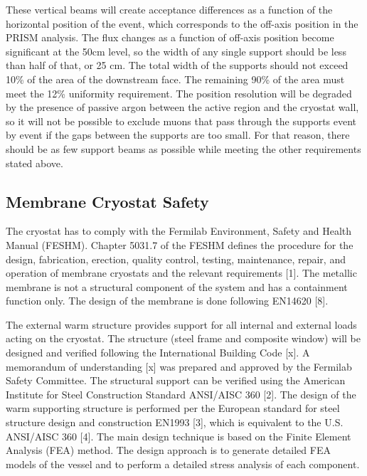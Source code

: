 These vertical beams will create acceptance differences as a function of the horizontal position of the event, which corresponds to the off-axis position in the PRISM analysis. The flux changes as a function of off-axis position become significant at the 50cm level, so the width of any single support should be less than half of that, or 25 cm. The total width of the supports should not exceed 10\% of the area of the downstream face. The remaining 90\% of the area must meet the 12\% uniformity requirement. The position resolution will be degraded by the presence of passive argon between the active region and the cryostat wall, so it will not be possible to exclude muons that pass through the supports event by event if the gaps between the supports are too small. For that reason, there should be as few support beams as possible while meeting the other requirements stated above.



\subsection{Membrane Cryostat Safety}
\label{sec:cryost-des-safety}

The  cryostat has to comply with the Fermilab Environment, Safety and Health Manual (FESHM). Chapter 5031.7 of the FESHM defines the procedure for the design, fabrication, erection, quality control, testing, maintenance, repair, and operation of membrane cryostats and the relevant requirements [1]. The metallic membrane is not a structural component of the system and has a containment function only. The design of the membrane is done following EN14620 [8].

The external warm structure provides support for all internal and external loads acting on the cryostat. The structure (steel frame and composite window) will be designed and verified following the International Building Code [x]. A memorandum of understanding [x] was prepared and approved by the Fermilab Safety Committee. The structural support can be verified using the American Institute for Steel Construction Standard ANSI/AISC 360 [2]. The design of the warm supporting structure is performed per the European standard for steel structure design and construction EN1993 [3], which is equivalent to the U.S. ANSI/AISC 360 [4]. The main design technique is based on the Finite Element Analysis (FEA) method. The design approach is to generate detailed FEA models of the vessel and to perform a detailed stress analysis of each component. 

